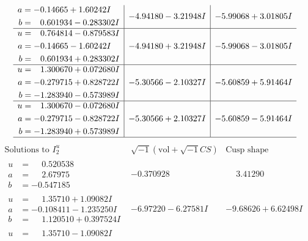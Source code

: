 \documentclass[1p]{elsarticle_modified}
\theoremstyle{definition}
\newcommand{\I}{\sqrt{-1}}
\begin{document}
$$\begin{array}{c|c|c}
\begin{aligned}
a &= -0.14665 + 1.60242 I \\
b &= \phantom{-}0.601934 - 0.283302 I\end{aligned}
 & -4.94180 - 3.21948 I & -5.99068 + 3.01805 I \\ \hline\begin{aligned}
u &= \phantom{-}0.764814 - 0.879583 I \\
a &= -0.14665 - 1.60242 I \\
b &= \phantom{-}0.601934 + 0.283302 I\end{aligned}
 & -4.94180 + 3.21948 I & -5.99068 - 3.01805 I \\ \hline\begin{aligned}
u &= \phantom{-}1.300670 + 0.072680 I \\
a &= -0.279715 + 0.828722 I \\
b &= -1.283940 - 0.573989 I\end{aligned}
 & -5.30566 - 2.10327 I & -5.60859 + 5.91464 I \\ \hline\begin{aligned}
u &= \phantom{-}1.300670 - 0.072680 I \\
a &= -0.279715 - 0.828722 I \\
b &= -1.283940 + 0.573989 I\end{aligned}
 & -5.30566 + 2.10327 I & -5.60859 - 5.91464 I\\
 \hline 
 \end{array}$$\newpage$$\begin{array}{c|c|c}  
\text{Solutions to }I^u_{2}& \I (\text{vol} + \sqrt{-1}CS) & \text{Cusp shape}\\
 \hline 
\begin{aligned}
u &= \phantom{-}0.520538\phantom{ +0.000000I} \\
a &= \phantom{-}2.67975\phantom{ +0.000000I} \\
b &= -0.547185\phantom{ +0.000000I}\end{aligned}
 & -0.370928\phantom{ +0.000000I} & \phantom{-}3.41290\phantom{ +0.000000I} \\ \hline\begin{aligned}
u &= \phantom{-}1.35710 + 1.09082 I \\
a &= -0.108411 - 1.235250 I \\
b &= \phantom{-}1.120510 + 0.397524 I\end{aligned}
 & -6.97220 - 6.27581 I & -9.68626 + 6.62498 I \\ \hline\begin{aligned}
u &= \phantom{-}1.35710 - 1.09082 I \\

\end{aligned}
\end{array}$$
\end{document}
